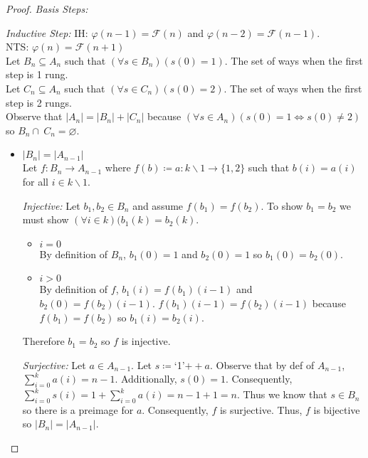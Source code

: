 \documentclass{article}
\newcommand{\Emptyset}{\varnothing}
\newcommand{\intersect}{\cap\:}
\newcommand{\defeq}{\coloneqq}
\newcommand{\fibonacci}{\mathcal{F}}
\newcommand{\concat}{+\!\!\!+}
\newenvironment{case}[1][Case]
    {\par\textit{#1:}\hfill\break}
    {}
\begin{document}
\begin{enumerate}
\begin{proof}
\begin{case}[Basis Steps]
    \end{case}
\pagebreak
    \begin{case}[Inductive Step]
        IH: $\varphi(n-1)=\fibonacci(n)$ and $\varphi(n-2)=\fibonacci(n-1)$.\\
        NTS: $\varphi(n)=\fibonacci(n+1)$\\
        Let $B_n \subseteq A_n$ such that $(\forall s \in B_n)(s(0)=1)$. The set of ways when the first step is 1 rung.\\ 
        Let $C_n \subseteq A_n$ such that $(\forall s \in C_n)(s(0)=2)$. The set of ways when the first step is 2 rungs.\\ 
        Observe that $|A_n| = |B_n|+|C_n|$ because $(\forall s \in A_n)(s(0)=1 \iff s(0)\neq2)$ so $B_n \intersect C_n = \Emptyset$.
        \begin{itemize}
            \item[] \!\!\!\!\!$|B_n|=|A_{n-1}|$\\
                Let $f:B_n \to A_{n-1}$ where $f(b)\defeq a: k\backslash1 \to \{1,2\}$ such that $b(i)=a(i)$ for all $i \in k\backslash1$.
                \begin{case}[Injective]
                    Let $b_1,b_2 \in B_n$ and assume $f(b_1)=f(b_2)$. To show $b_1=b_2$ we must show $(\forall i \in k)(b_1(k)=b_2(k)$.
                    \begin{itemize}
                        \item []$i=0$\\
                            By definition of $B_n$, $b_1(0)=1$ and $b_2(0)=1$ so $b_1(0)=b_2(0)$.
                        \item []$i>0$\\
                            By definition of $f$, $b_1(i)=f(b_1)(i-1)$ and $b_2(0)=f(b_2)(i-1)$. $f(b_1)(i-1)=f(b_2)(i-1)$ because $f(b_1)=f(b_2)$ so $b_1(i)=b_2(i)$.
                    \end{itemize}
                    Therefore $b_1=b_2$ so $f$ is injective.
                \end{case}
                \begin{case}[Surjective]
                    Let $a \in A_{n-1}$. Let $s\defeq$`1'$\concat a$. Observe that by def of $A_{n-1}$, $\sum_{i=0}^{k}a(i)=n-1$. Additionally, $s(0)=1$. Consequently, $\sum_{i=0}^{k}s(i)=1+\sum_{i=0}^{k}a(i)=n-1+1=n$.  Thus we know that $s \in B_n$ so there is a preimage for $a$. Consequently, $f$ is surjective.
                \end{case}
                Thus, $f$ is bijective so $|B_n|=|A_{n-1}|$.

\end{itemize}
\end{case}
\end{proof}
\end{enumerate}
\end{document}
